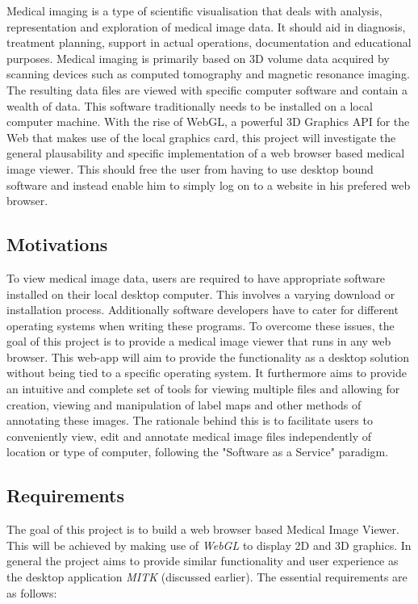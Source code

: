\documentclass[a4paper,11pt,twoside]{article}
\begin{document}
Medical imaging is a type of scientific visualisation that deals with analysis, representation and exploration of medical image data. It should aid in diagnosis, treatment planning, support in actual operations, documentation and educational purposes. Medical imaging is primarily based on 3D volume data acquired by scanning devices such as computed tomography and magnetic resonance imaging. The resulting data files are viewed with specific computer software and contain a wealth of data. This software traditionally needs to be installed on a local computer machine. With the rise of WebGL, a powerful 3D Graphics API for the Web that makes use of the local graphics card, this project will investigate the general plausability and specific implementation of a web browser based medical image viewer. This should free the user from having to use desktop bound software and instead enable him to simply log on to a website in his prefered web browser.

\subsection{Motivations}

To view medical image data, users are required to have appropriate software installed on their local desktop computer. This involves a varying download or installation process. Additionally software developers have to cater for different operating systems when writing these programs. To overcome these issues, the goal of this project is to provide a medical image viewer that runs in any web browser. This web-app will aim to provide the functionality as a desktop solution without being tied to a specific operating system. It furthermore aims to provide an intuitive and complete set of tools for viewing multiple files and allowing for creation, viewing and manipulation of label maps and other methods of annotating these images. The rationale behind this is to facilitate users to conveniently view, edit and annotate medical image files independently of location or type of computer, following the "Software as a Service" paradigm.


\subsection{Requirements}


The goal of this project is to build a web browser based Medical Image Viewer. This will be achieved by making use of \textit{WebGL} to display 2D and 3D graphics. In general the project aims to provide similar functionality and user experience as the desktop application \textit{MITK} (discussed earlier). The essential requirements are as follows:
\end{document}
